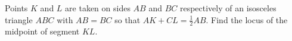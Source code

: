 \problem{}
Points $K$ and $L$ are taken on sides $AB$ and $BC$ respectively of an isosceles
triangle $ABC$ with $AB = BC$ so that $AK + CL = \frac{1}{2} AB$.
Find the locus of the midpoint of segment $KL$.
\solution
\endproblem
